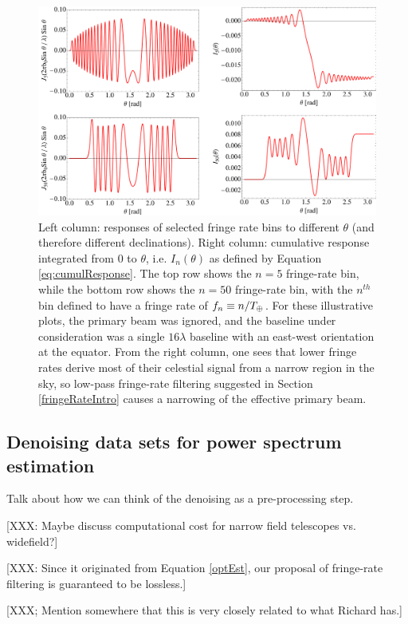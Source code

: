 \documentclass[twocolumn,numberedappendix]{emulateapj}
\begin{document}
\begin{figure}
\centering
\includegraphics[width=1.0\textwidth]{plots/besselContributions.pdf}
\caption{
Left column: responses of selected fringe rate bins to different $\theta$ (and
therefore different declinations).  Right column: cumulative response
integrated from $0$ to $\theta$, i.e. $I_n (\theta)$ as defined by Equation
\eqref{eq:cumulResponse}.  The top row shows the $n=5$ fringe-rate bin, while
the bottom row shows the $n=50$ fringe-rate bin, with the $n^{th}$ bin defined
to have a fringe rate of $f_n \equiv n / T_\oplus$.  For these illustrative
plots, the primary beam was ignored, and the baseline under consideration was a
single $16\lambda$ baseline with an east-west orientation at the equator.  From
the right column, one sees that lower fringe rates derive most of their
celestial signal from a narrow region in the sky, so low-pass fringe-rate
filtering suggested in Section \ref{fringeRateIntro} causes a narrowing of the
effective primary beam.
}
\label{besselContributions}
\end{figure}

\subsection{Denoising data sets for power spectrum estimation}
Talk about how we can think of the denoising as a pre-processing step.

[XXX: Maybe discuss computational cost for narrow field telescopes vs. widefield?]

[XXX: Since it originated from Equation \eqref{optEst}, our proposal of fringe-rate filtering is guaranteed to be lossless.]

[XXX; Mention somewhere that this is very closely related to what Richard has.]
\end{document}
